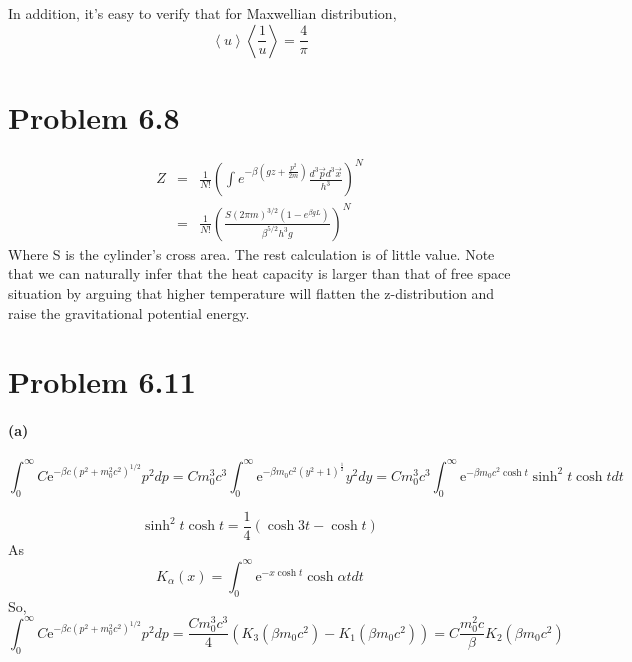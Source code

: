 \documentclass{article}
\begin{document}
	In addition, it's easy to verify that for Maxwellian distribution,
	\begin{equation}
		\left< u\right> \left< \frac{1}{u} \right>=\frac{4}{\pi}
	\end{equation}



\section*{Problem 6.8}
\begin{eqnarray*}
Z&=&\frac{1}{N!}(\int e^{-\beta (gz+\frac{p^2}{2m})}\frac{d^3\vec{p}d^3\vec{x}}{h^3})^N  \\
&=&\frac{1}{N!}(\frac{S(2\pi m)^{3/2}(1-e^{\beta gL})}{\beta^{5/2}h^3 g})^N
\end{eqnarray*}
Where S is the cylinder's cross area. The rest calculation is of little value. Note that we can naturally infer that the heat capacity is larger than that of free space situation by arguing that higher temperature will flatten the z-distribution and raise the gravitational potential energy.


\section*{Problem 6.11}
\paragraph*{(a)}
\begin{equation}
\int_{0}^{\infty} C \mathrm{e}^{-\beta c (p^2+m_0^2c^2)^{1/2}} p^2 dp = Cm_0^3c^3 \int_0^{\infty} \mathrm{e}^{-\beta m_0c^2 (y^2+1)^{\frac{1}{2}}} y^2 dy = Cm_0^3c^3 \int_0^{\infty} \mathrm{e}^{-\beta m_0c^2 \cosh t} \sinh^2t \cosh t dt
\end{equation}

\begin{equation}
\sinh^2 t \cosh t = \frac{1}{4} (\cosh 3t -\cosh t)
\end{equation}
As
\begin{equation}
K_{\alpha}(x)= \int_0^{\infty} \mathrm{e}^{-x\cosh t} \cosh \alpha t dt  
\end{equation}
So,
\begin{equation}
\int_{0}^{\infty} C \mathrm{e}^{-\beta c (p^2+m_0^2c^2)^{1/2}} p^2 dp = \frac{Cm_0^3c^3}{4} (K_3(\beta m_0c^2)-K_1(\beta m_0c^2)) = C \frac{m_0^2 c}{\beta} K_2(\beta m_0 c^2)
\end{equation}
\end{document}
